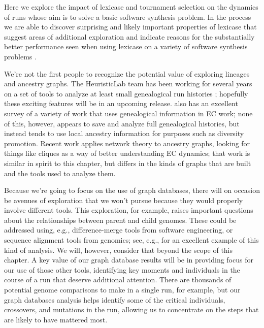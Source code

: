 Here we explore the impact of lexicase \citep{Spector:2012:GECCOcompA} and tournament selection 
on the dynamics of runs whose aim is to solve a basic software synthesis problem. 
In the process we are able to discover surprising and likely important properties of
lexicase that suggest areas of additional exploration and indicate reasons
for the substantially better performance seen when using lexicase on a variety of software synthesis 
problems \citep{Helmuth:2015:GECCO}.

We're not the first people to recognize the potential value of exploring lineages and ancestry graphs. 
The HeuristicLab team has been
working for several years on a set of tools to analyze at least small genealogical run histories 
\citep{Burlacu:2013:GECCOcomp:new, Burlacu:CIEES:2015}; hopefully these exciting features will be in 
an upcoming release. \citep{Burlacu:2013:GECCOcomp:new} also has an excellent survey of a variety of work
that uses genealogical information in EC work; none of this, however, appears to save and analyze full 
genealogical histories, but instead tends to use local ancestry information for purposes such as diversity
promotion. Recent work \citep{kuber2014ancestral} applies network theory to ancestry graphs, looking
for things like cliques as a way of better understanding EC dynamics; that work is similar in spirit to this
chapter, but differs in the kinds of graphs that are built and the tools used to analyze them.

Because we're going to focus on the use of graph databases, there will
on occasion be avenues of exploration that we won't pursue because they would properly involve
different tools. This exploration, for example, raises important questions about the relationships between
parent and child genomes. These could be addressed using, e.g.,
difference-merge tools from software engineering, or sequence alignment tools from genomics;
see, e.g., \citep{Burlacu:2013:GECCOcomp:new}
for an excellent example of this kind of analysis. We will, however, consider that
beyond the scope of this chapter. A key value of our graph database results will be in providing focus
for our use of those other tools, identifying key moments
and individuals in the course of a run that deserve additional attention. There are thousands
of potential genome comparisons to make in a single run, for example, but our graph databases analysis helps identify
some of the critical individuals, crossovers, and mutations in the run, allowing us to concentrate on the
steps that are likely to have mattered most.

